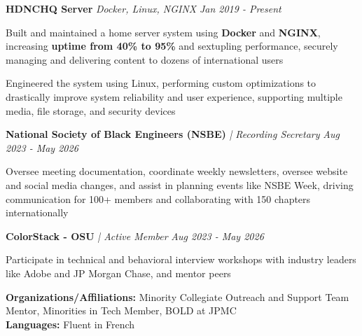 \documentclass[letterpaper]{article}
\begin{document}
    {\textbf{HDNCHQ Server}} {\sl Docker, Linux, NGINX} \hfill \textsl{Jan 2019 - Present}\\
    \vspace{-2mm}
    \begin{tightitemize} \itemsep -1mm

        \item Built and maintained a home server system using \textbf{Docker} and \textbf{NGINX}, increasing \textbf{uptime from 40\% to 95\%} and sextupling performance, securely managing and delivering content to dozens of international users
        
        \item Engineered the system using Linux, performing custom optimizations to drastically improve system reliability and user experience, supporting multiple media, file storage, and security devices
        
    \end{tightitemize}
    \vspace{-2mm}

\vspace{1mm}

    \textbf{National Society of Black Engineers (NSBE)} \textit{| Recording Secretary} \hfill \textsl{Aug 2023 - May 2026}\\
    \vspace{-2mm}
    \begin{tightitemize} \itemsep -1mm
    
        \item Oversee meeting documentation, coordinate weekly newsletters, oversee website and social media changes, and assist in planning events like NSBE Week, driving communication for 100+ members and collaborating with 150 chapters internationally
        
    \end{tightitemize}
    \vspace{-1mm}

    \textbf{ColorStack - OSU} \textit{| Active Member} \hfill \textsl{Aug 2023 - May 2026}\\
    \vspace{-2mm}
    \begin{tightitemize} \itemsep -1mm
    
        \item Participate in technical and behavioral interview workshops with industry leaders like Adobe and JP Morgan Chase, and mentor peers
        
    \end{tightitemize}
    \vspace{-1mm}

\vspace{1mm}

    \textbf{Organizations/Affiliations:} Minority Collegiate Outreach and Support Team Mentor, Minorities in Tech Member, BOLD at JPMC \\
    \textbf{Languages:} Fluent in French \\
\vspace{2mm}
\end{document}
